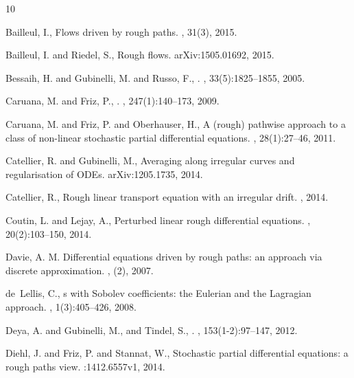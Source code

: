 \documentclass[11pt,a4paper]{amsart}
\numberwithin{equation}{section} %
\begin{document}
\begin{thebibliography}{10}

Bailleul, I.,
\newblock Flows driven by rough paths.
, 31(3), 2015.


Bailleul, I. and Riedel, S.,
\newblock Rough flows.
\newblock arXiv:1505.01692, 2015. 

Bessaih, H. and  Gubinelli, M. and Russo, F.,
.
, 33(5):1825--1855, 2005.

 Caruana, M. and Friz, P.,
.
, 247(1):140--173, 2009.

Caruana, M. and Friz, P. and Oberhauser, H.,
\newblock A (rough) pathwise approach to a class of non-linear stochastic partial differential equations.
, 28(1):27--46, 2011.

Catellier, R. and Gubinelli, M.,
\newblock Averaging along irregular curves and regularisation of ODEs.
\newblock arXiv:1205.1735, 2014.

Catellier, R.,
\newblock Rough linear transport equation with an irregular drift.
, 2014.

Coutin, L. and Lejay, A.,
\newblock Perturbed linear rough differential equations.
, 20(2):103--150, 2014.

Davie, A. M.
\newblock Differential equations driven by rough paths: an approach via discrete approximation.
, (2), 2007.

de~Lellis, C.,
s with {S}obolev coefficients: the {E}ulerian and the {L}agragian approach.
, 1(3):405--426, 2008.

Deya, A. and Gubinelli, M., and  Tindel, S.,
.
, 153(1-2):97--147, 2012.

Diehl, J. and Friz, P. and Stannat, W.,
\newblock Stochastic partial differential equations: a rough paths view.
:1412.6557v1, 2014.


\end{thebibliography}
\end{document}
